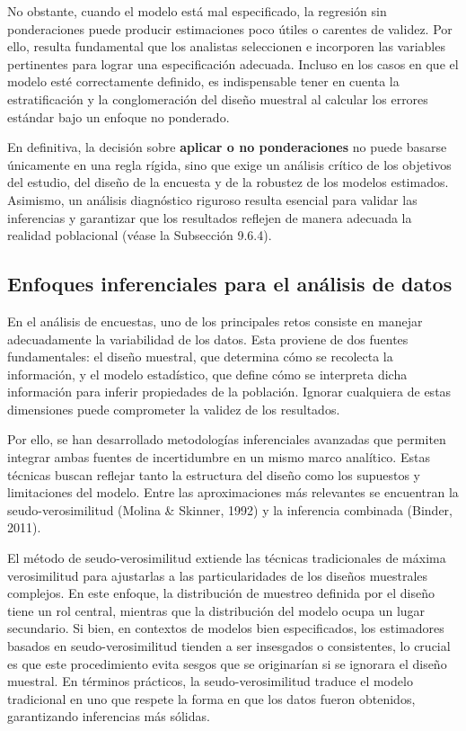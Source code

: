 \documentclass[
  12pt,
]{book}
\begin{document}
No obstante, cuando el modelo está mal especificado, la regresión sin ponderaciones puede producir estimaciones poco útiles o carentes de validez. Por ello, resulta fundamental que los analistas seleccionen e incorporen las variables pertinentes para lograr una especificación adecuada. Incluso en los casos en que el modelo esté correctamente definido, es indispensable tener en cuenta la estratificación y la conglomeración del diseño muestral al calcular los errores estándar bajo un enfoque no ponderado.

En definitiva, la decisión sobre \textbf{aplicar o no ponderaciones} no puede basarse únicamente en una regla rígida, sino que exige un análisis crítico de los objetivos del estudio, del diseño de la encuesta y de la robustez de los modelos estimados. Asimismo, un análisis diagnóstico riguroso resulta esencial para validar las inferencias y garantizar que los resultados reflejen de manera adecuada la realidad poblacional (véase la Subsección 9.6.4).

\subsection{Enfoques inferenciales para el análisis de datos}\label{enfoques-inferenciales-para-el-anuxe1lisis-de-datos}

En el análisis de encuestas, uno de los principales retos consiste en manejar adecuadamente la variabilidad de los datos. Esta proviene de dos fuentes fundamentales: el diseño muestral, que determina cómo se recolecta la información, y el modelo estadístico, que define cómo se interpreta dicha información para inferir propiedades de la población. Ignorar cualquiera de estas dimensiones puede comprometer la validez de los resultados.

Por ello, se han desarrollado metodologías inferenciales avanzadas que permiten integrar ambas fuentes de incertidumbre en un mismo marco analítico. Estas técnicas buscan reflejar tanto la estructura del diseño como los supuestos y limitaciones del modelo. Entre las aproximaciones más relevantes se encuentran la seudo-verosimilitud (Molina \& Skinner, 1992) y la inferencia combinada (Binder, 2011).

El método de seudo-verosimilitud extiende las técnicas tradicionales de máxima verosimilitud para ajustarlas a las particularidades de los diseños muestrales complejos. En este enfoque, la distribución de muestreo definida por el diseño tiene un rol central, mientras que la distribución del modelo ocupa un lugar secundario. Si bien, en contextos de modelos bien especificados, los estimadores basados en seudo-verosimilitud tienden a ser insesgados o consistentes, lo crucial es que este procedimiento evita sesgos que se originarían si se ignorara el diseño muestral. En términos prácticos, la seudo-verosimilitud traduce el modelo tradicional en uno que respete la forma en que los datos fueron obtenidos, garantizando inferencias más sólidas.
\end{document}
